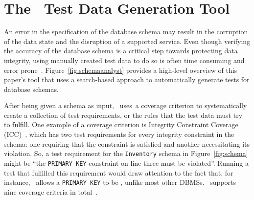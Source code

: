 \section{The \sa~Test Data Generation Tool}\label{sec:technique}


An error in the specification of the database schema may result in the corruption of the data state and the disruption
of a supported service. Even though verifying the accuracy of the database schema is a critical step towards protecting
data integrity, using manually created test data to do so is often time consuming and error
prone~\cite{kapfhammer2013search}. Figure~\ref{fig:schemaanalyst} provides a high-level overview of this paper's tool
that uses a search-based approach to automatically generate tests for database schemas.


After being given a schema as input, \mbox{\sa~uses a} coverage criterion to systematically create a collection of test
requirements, or the rules that the test data must try to fulfill. One example of a coverage criterion
is Integrity Constraint Coverage (ICC)~\cite{mcminn2015effectiveness}, which has two test requirements for every
integrity constraint in the schema: one requiring that the constraint is satisfied and another necessitating its
violation. So, a test requirement for the \texttt{Inventory} schema in Figure~\ref{fig:schema} might be ``the
\texttt{PRIMARY KEY} constraint on line three must be violated''. Running a test that fulfilled this requirement would
draw attention to the fact that, for instance, \sqlite~allows a \texttt{PRIMARY KEY} to be \NULL, unlike most other
DBMSs. \sa~supports nine coverage criteria in total~\cite{mcminn2015effectiveness}.





